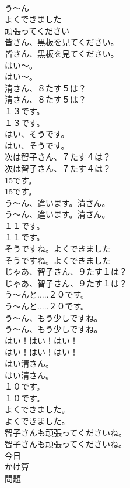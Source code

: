 \documentclass[8pt]{extreport}
\begin{document}
\begin{CJK}{UTF8}{min}
\\	う〜ん
\\	よくできました
\\	頑張ってください
\\	皆さん、黒板を見てください。	
\\	皆さん、黒板を見てください。 
\\	はい～。	
\\	はい～。 
\\	清さん、８たす５は？	
\\	清さん、８たす５は？ 
\\	１３です。	
\\	１３です。 
\\	はい、そうです。	
\\	はい、そうです。 
\\	次は智子さん、７たす４は？	
\\	次は智子さん、７たす４は？ 
\\	15です。	
\\	15です。 
\\	う～ん、違います。清さん。	
\\	う～ん、違います。清さん。 
\\	１１です。	
\\	１１です。 
\\	そうですね。よくできました
\\	そうですね。よくできました
\\	じゃあ、智子さん、９たす１は？	
\\	じゃあ、智子さん、９たす１は？ 
\\	う～んと.....２０です。	
\\	う～んと.....２０です。 
\\	う～ん、もう少しですね。	
\\	う～ん、もう少しですね。 
\\	はい！はい！はい！	
\\	はい！はい！はい！ 
\\	はい清さん。	
\\	はい清さん。 
\\	１０です。	
\\	１０です。 
\\	よくできました。	
\\	よくできました。 
\\	智子さんも頑張ってくださいね。	
\\	智子さんも頑張ってくださいね。 
\\	今日
\\	かけ算
\\	問題

\end{CJK}
\end{document}
